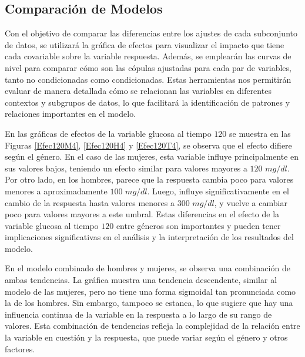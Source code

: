 
\subsection{Comparación de Modelos}

Con el objetivo de comparar las diferencias entre los ajustes de cada subconjunto de datos, se utilizará la gráfica de efectos para visualizar el impacto que tiene cada covariable sobre la variable respuesta. Además, se emplearán las curvas de nivel para comparar cómo son las cópulas ajustadas para cada par de variables, tanto no condicionadas como condicionadas. Estas herramientas nos permitirán evaluar de manera detallada cómo se relacionan las variables en diferentes contextos y subgrupos de datos, lo que facilitará la identificación de patrones y relaciones importantes en el modelo.

En las gráficas de efectos de la variable glucosa al tiempo $120$ se muestra en las Figuras \ref{Efec120M4}, \ref{Efec120H4} y \ref{Efec120T4}, se observa que el efecto difiere según el género. En el caso de las mujeres, esta variable influye principalmente en sus valores bajos, teniendo un efecto similar para valores mayores a $120$ $mg/dl$. Por otro lado, en los hombres, parece que la respuesta cambia poco para valores menores a aproximadamente $100$ $mg/dl$. Luego, influye significativamente en el cambio de la respuesta hasta valores menores a $300$ $mg/dl$, y vuelve a cambiar poco para valores mayores a este umbral. Estas diferencias en el efecto de la variable glucosa al tiempo $120$ entre géneros son importantes y pueden tener implicaciones significativas en el análisis y la interpretación de los resultados del modelo.

En el modelo combinado de hombres y mujeres, se observa una combinación de ambas tendencias. La gráfica muestra una tendencia descendente, similar al modelo de las mujeres, pero no tiene una forma sigmoidal tan pronunciada como la de los hombres. Sin embargo, tampoco se estanca, lo que sugiere que hay una influencia continua de la variable en la respuesta a lo largo de su rango de valores. Esta combinación de tendencias refleja la complejidad de la relación entre la variable en cuestión y la respuesta, que puede variar según el género y otros factores.


